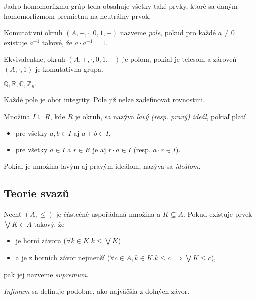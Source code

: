 Jadro homomorfizmu grúp teda obsahuje všetky také prvky, ktoré sa daným
homomorfizmom premietnu na neutrálny prvok.

\begin{definition}[Pole]
Komutativní okruh $(A, +, \cdot, 0, 1, -)$ nazveme {\em pole}, pokud
pro každé $a \neq 0$ existuje $a^{-1}$ takové, že $a \cdot a^{-1} = 1$.
\end{definition}

Ekvivalentne, okruh $(A, +, \cdot, 0, 1, -)$ je poľom, pokiaľ je telesom
a zároveň $(A, \cdot, 1)$ je komutatívna grupa.

\begin{example}
    $\mathbb{Q}, \mathbb{R}, \mathbb{C}, \mathbb{Z}_n.$
\end{example}

Každé pole je obor integrity. Pole již nelze zadefinovat rovnostmi.

\begin{definition}[Ideál]
	Množina $I \subseteq R$, kde $R$ je okruh, sa nazýva 
	{\em ľavý (resp. pravý) ideál}, pokiaľ platí
	\begin{itemize}
		\item pre všetky $a,b \in I$ aj $a+b \in I$,
		\item pre všetky $a \in I$ a $r \in R$ je aj $r \cdot a \in I$ (resp. $a \cdot r \in I$).
	\end{itemize}
	Pokiaľ je množina ľavým aj pravým ideálom, nazýva sa {\em ideálom}.
\end{definition}

\subsection{Teorie svazů}

\begin{definition}[Supremum]
    Nechť $(A, \leq)$ je částečně uspořádaná množina
    a $K \subseteq A$. Pokud existuje prvek $\bigvee K \in A$ takový,
    že
    \begin{itemize}
        \item je horní závora ($\forall k \in K . k \leq \bigvee K$)
        \item a je z horních závor nejmenší
    ($\forall c \in A, k \in K . k \leq c \implies \bigvee K \leq c$),
    \end{itemize}
    pak jej nazveme {\em supremum}.
\end{definition}

{\em Infimum} sa definuje podobne, ako najväčšia z dolných závor.

